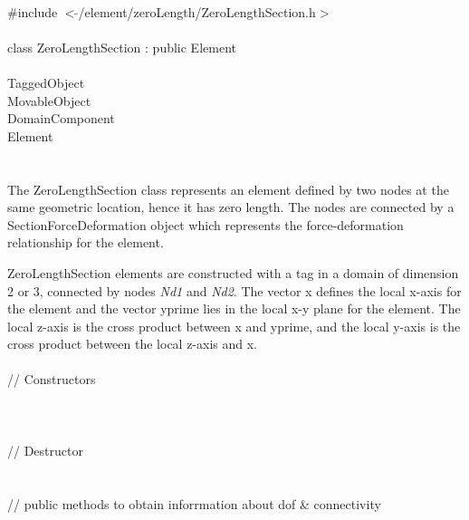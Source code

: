 
   \\
\indent \#include $<\tilde{ }$/element/zeroLength/ZeroLengthSection.h$>$  \\

  \\
\indent class ZeroLengthSection : public Element \\

 \\
\indent TaggedObject \\
\indent MovableObject \\
\indent\indent DomainComponent \\
\indent\indent\indent Element \\
\indent\indent\indent{} \\

  \\
\indent 
The ZeroLengthSection class represents an element defined by two nodes at the same geometric
location, hence it has zero length.
The nodes are connected by a SectionForceDeformation object which
represents the force-deformation relationship for the element. 

ZeroLengthSection elements are constructed with a \p tag in a domain of \p dimension 2 or 3,
connected by nodes {\em Nd1} and {\em Nd2}. 
The vector \p x defines the local x-axis for the element and the vector \p yprime
lies in the local x-y plane for the element.  The local z-axis is the cross product between 
\p x and \p yprime, and the local y-axis is the cross product between the local z-axis
and \p x.
\\

 \\
\indent // Constructors \\
 \\
 \\ \\
\indent // Destructor \\
 \\ \\
\indent    // public methods to obtain inforrmation about dof \& connectivity \\
 \\
 \\
 \\	
 \\


